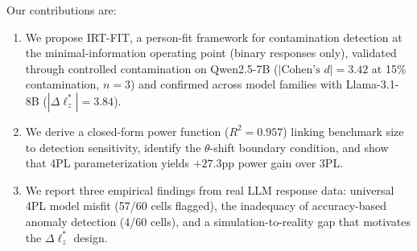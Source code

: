 Our contributions are:
\begin{enumerate}[leftmargin=*,nosep]
\item We propose IRT-FIT, a person-fit framework for contamination detection at the minimal-information operating point (binary responses only), validated through controlled contamination on Qwen2.5-7B ($|\text{Cohen's } d| = 3.42$ at 15\% contamination, $n{=}3$) and confirmed across model families with Llama-3.1-8B ($|\Delta\ell_z^*| = 3.84$).
\item We derive a closed-form power function ($R^2 = 0.957$) linking benchmark size to detection sensitivity, identify the $\theta$-shift boundary condition, and show that 4PL parameterization yields $+27.3$pp power gain over 3PL.
\item We report three empirical findings from real LLM response data: universal 4PL model misfit (57/60 cells flagged), the inadequacy of accuracy-based anomaly detection (4/60 cells), and a simulation-to-reality gap that motivates the $\Delta\ell_z^*$ design.
\end{enumerate}
